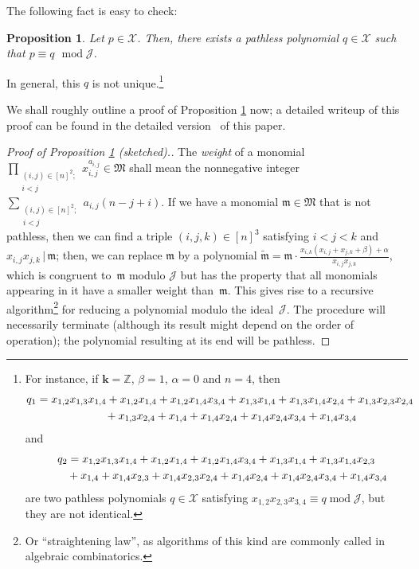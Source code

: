 \documentclass[pdftex]{sigma}
\newtheorem{Proposition}[Theorem]{Proposition}
\numberwithin{equation}{section}
\let\sumnonlimits\sum
\let\prodnonlimits\prod
\renewcommand{\sum}{\sumnonlimits\limits}
\renewcommand{\prod}{\prodnonlimits\limits}
\begin{document}
The following fact is easy to check:

\begin{Proposition}\label{prop.path-red.span}Let $p\in\mathcal{X}$. Then, there exists a pathless polynomial $q\in\mathcal{X}$ such that $p\equiv q$ $\operatorname{mod} \mathcal{J}$.
\end{Proposition}

In general, this $q$ is not unique.\footnote{For instance, if $\mathbf{k}=\mathbb{Z}$, $\beta=1$, $\alpha=0$ and $n=4$, then
\begin{gather*}
q_{1} =x_{1,2}x_{1,3}x_{1,4}+x_{1,2}x_{1,4}+x_{1,2}x_{1,4}x_{3,4} +x_{1,3}x_{1,4}+x_{1,3}x_{1,4}x_{2,4}+x_{1,3}x_{2,3}x_{2,4}\\
\hphantom{q_{1} =}{} +x_{1,3}x_{2,4}+x_{1,4}+x_{1,4}x_{2,4}+x_{1,4}x_{2,4}x_{3,4}+x_{1,4}x_{3,4}%
\end{gather*}
and%
\begin{gather*}
q_{2} =x_{1,2}x_{1,3}x_{1,4}+x_{1,2}x_{1,4}+x_{1,2}x_{1,4}x_{3,4}+x_{1,3}x_{1,4}+x_{1,3}x_{1,4}x_{2,3}\\
\hphantom{q_{2} =}{} +x_{1,4}+x_{1,4}x_{2,3}+x_{1,4}x_{2,3}x_{2,4}+x_{1,4}x_{2,4}+x_{1,4}x_{2,4}x_{3,4}+x_{1,4}x_{3,4}
\end{gather*}
are two pathless polynomials $q\in\mathcal{X}$ satisfying $x_{1,2}x_{2,3}x_{3,4}\equiv q\operatorname{mod}\mathcal{J}$, but they are not identical.}

We shall roughly outline a proof of Proposition \ref{prop.path-red.span} now; a detailed writeup of this proof can be found in the detailed version~\cite{verlong} of this paper.

\begin{proof}[Proof of Proposition \ref{prop.path-red.span} (sketched).]The \textit{weight} of a monomial $\prod_{\substack{(i,j) \in[n] ^{2};\\i<j}}x_{i,j}^{a_{i,j}}\in\mathfrak{M}$ shall mean the nonnegative integer $\sum_{\substack{(i,j) \in[n] ^{2};\\i<j}}a_{i,j}(n-j+i) $. If we have a monomial $\mathfrak{m}\in\mathfrak{M}$ that is not pathless, then we can find a triple $ (i,j,k) \in[n] ^{3}$ satisfying $i<j<k$ and $x_{i,j}x_{j,k}\,|\,\mathfrak{m}$; then, we can replace $\mathfrak{m}$ by a polynomial $\widetilde{\mathfrak{m}}=\mathfrak{m}\cdot\frac{x_{i,k}(x_{i,j}+x_{j,k}+\beta) +\alpha}{x_{i,j}x_{j,k}}$, which is congruent to~$\mathfrak{m}$ modulo $\mathcal{J}$ but has the property that all monomials appearing in it have a smaller weight than~$\mathfrak{m}$. This gives rise to a recursive algorithm\footnote{Or ``straightening law'', as algorithms of this kind are commonly called in algebraic combinatorics.} for reducing a polynomial modulo the ideal~$\mathcal{J}$. The procedure will necessarily terminate (although its result might depend on the order of operation); the polynomial resulting at its end will be pathless.
\end{proof}
\end{document}
